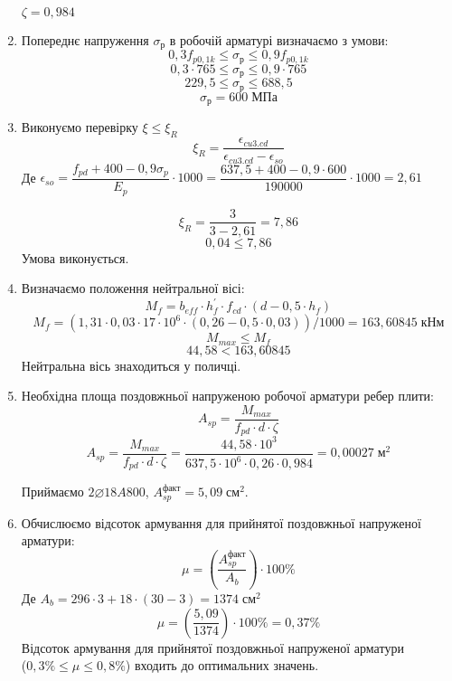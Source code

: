 \documentclass[a4paper,14pt]{article}
\begin{document}
\begin{enumerate}
        $\zeta = 0,984$
    \item Попереднє напруження $\sigma_{\textit{р}}$ в робочій арматурі визначаємо з умови:
        \begin{equation}
            0,3f_{p0,1k} \leq \sigma_{\textit{р}} \leq 0,9f_{p0,1k}
        \end{equation}
        $$0,3 \cdot 765 \leq \sigma_{\textit{р}} \leq 0,9 \cdot 765$$
        $$229,5 \leq \sigma_{\textit{р}} \leq 688,5$$
        $$\sigma_{\textit{р}} = 600\;\textit{МПа}$$
    \item Виконуємо перевірку $\xi \leq \xi_R$
        \begin{equation}
            \xi_R = \dfrac{\epsilon_{cu3.cd}}{\epsilon_{cu3.cd} - \epsilon_{so}}
        \end{equation}
        Де $\epsilon_{so} = \dfrac{f_{pd} + 400 - 0,9\sigma_{p}}{E_p} \cdot 1000 = \dfrac{637,5 + 400 - 0,9 \cdot 600}{190000} \cdot 1000 = 2,61$

        $$\xi_R = \dfrac{3}{3 - 2,61} = 7,86$$
        $$0,04 \leq 7,86$$
        Умова виконується.
    \item Визначаємо положення нейтральної вісі:
        \begin{equation}
            M_f = b_{eff} \cdot h_f^\prime \cdot f_{cd} \cdot (d - 0,5 \cdot h_f)
        \end{equation}
        $$M_f = (1,31 \cdot 0,03 \cdot 17 \cdot 10^6 \cdot (0,26 - 0,5 \cdot 0,03))/1000 = 163,60845\;\textit{кНм}$$
        $$M_{max} \leq M_f$$
        $$44,58 < 163,60845$$
        Нейтральна вісь знаходиться у поличці.
    \item Необхідна площа поздовжньої напруженою робочої арматури ребер плити:
        \begin{equation}
            A_{sp} = \dfrac{M_{max}}{f_{pd} \cdot d \cdot \zeta}
        \end{equation}
        $$A_{sp} = \dfrac{M_{max}}{f_{pd} \cdot d \cdot \zeta} = \dfrac{44,58 \cdot 10^3}{637,5 \cdot 10^6 \cdot 0,26 \cdot 0,984} = 0,00027\;\textit{м}^2$$
        
        Приймаємо $2\varnothing18A800$, $A_{sp}^{\textit{факт}} = 5,09\;\textit{см}^2$.
    \item Обчислюємо відсоток армування для прийнятої поздовжньої напруженої арматури:
        \begin{equation}
            \mu = \left(\dfrac{A_{sp}^{\textit{факт}}}{A_b}\right) \cdot 100\%
        \end{equation}
        Де $A_b = 296 \cdot 3 + 18 \cdot (30 -3) = 1374\;\textit{см}^2$
        $$\mu = \left(\dfrac{5,09}{1374}\right) \cdot 100\% = 0,37\%$$
        Відсоток армування для прийнятої поздовжньої напруженої арматури\\($0,3\% \leq \mu \leq 0,8\%$) входить до оптимальних значень.
\end{enumerate}
\end{document}
